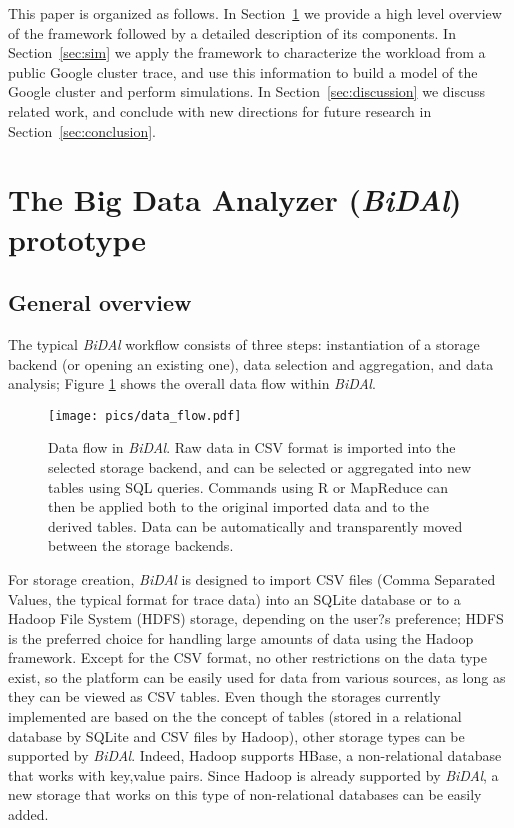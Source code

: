 \documentclass{article}
\begin{document}
This paper is organized as follows. In Section~\ref{sec:bidal} we provide a high level overview of the framework followed by a detailed description of its components. In Section~\ref{sec:sim} we apply the framework to characterize the workload from a public Google cluster trace, and use this information to build a model of the Google cluster and perform simulations. In Section~\ref{sec:discussion} we discuss related work, and conclude with new directions for future research in Section~\ref{sec:conclusion}.



\section{The Big Data Analyzer (\emph{BiDAl}) prototype}
\label{sec:bidal}

\subsection{General overview}

The typical \emph{BiDAl} workflow consists of three steps: instantiation of a storage backend (or opening an existing one), data selection and aggregation, and data analysis; Figure \ref{fig:data_flow} shows the overall data flow within \emph{BiDAl}. 

\begin{figure}[ht]
\centering
  \texttt{[image: pics/data\_flow.pdf]}
\caption{Data flow in \emph{BiDAl}. Raw data in CSV format is imported into the selected storage backend, and can be selected or aggregated into new tables using SQL queries. Commands using R or MapReduce can then be applied both to the original imported data and to the derived tables. Data can be automatically and transparently moved between the storage backends.}
\label{fig:data_flow}       
\end{figure}


For storage creation, \emph{BiDAl} is designed to import CSV files (Comma Separated Values, the typical format for trace data) into an SQLite database or to a Hadoop File System (HDFS) storage, depending on the user?s preference; HDFS is the preferred choice for handling large amounts of data using the Hadoop framework. Except for the CSV format, no other restrictions on the data type exist, so the platform can be easily used for data from various sources, as long as they can be viewed as CSV tables. Even though the storages currently implemented are based on the the concept of tables (stored in a relational database by SQLite and CSV files by Hadoop), other storage types can be supported by \emph{BiDAl}. Indeed, Hadoop supports HBase, a non-relational database that works with key,value pairs. Since Hadoop is already supported by \emph{BiDAl}, a new storage that works on this type of non-relational databases can be easily added.
\end{document}
